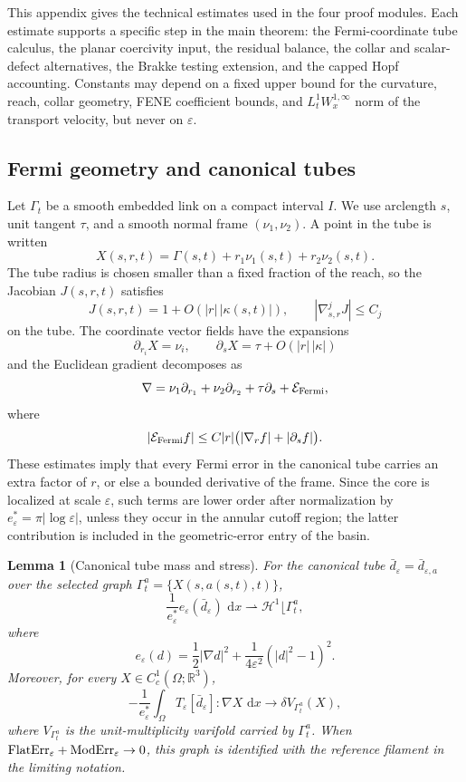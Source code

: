 \documentclass[11pt]{article}
\newtheorem{lemma}[theorem]{Lemma}
\theoremstyle{definition}
\newcommand{\R}{\mathbb R}
\newcommand{\dd}{\,\mathrm d}
\newcommand{\eps}{\varepsilon}
\newcommand{\estar}{e_\varepsilon^\ast}
\newcommand{\Hh}{\mathcal H}
\begin{document}
This appendix gives the technical estimates used in the four proof modules.
Each estimate supports a specific step in the main theorem: the Fermi-coordinate
tube calculus, the planar coercivity input, the residual balance, the collar and
scalar-defect alternatives, the Brakke testing extension, and the capped Hopf
accounting.  Constants may depend on a fixed upper bound for the curvature,
reach, collar geometry, FENE coefficient bounds, and \(L^1_tW^{1,\infty}_x\)
norm of the transport velocity, but never on \(\eps\).

\subsection{Fermi geometry and canonical tubes}

Let \(\Gamma_t\) be a smooth embedded link on a compact interval \(I\).  We use
arclength \(s\), unit tangent \(\tau\), and a smooth normal frame
\((\nu_1,\nu_2)\).  A point in the tube is written
\[
        X(s,r,t)
        =
        \Gamma(s,t)+r_1\nu_1(s,t)+r_2\nu_2(s,t).
\]
The tube radius is chosen smaller than a fixed fraction of the reach, so the
Jacobian \(J(s,r,t)\) satisfies
\[
        J(s,r,t)=1+O(|r|\,|\kappa(s,t)|),
        \qquad
        |\nabla_{s,r}^jJ|\le C_j
\]
on the tube.  The coordinate vector fields have the expansions
\[
        \partial_{r_i}X=\nu_i,
        \qquad
        \partial_sX
        =
        \tau
        +
        O(|r|\,|\kappa|)
\]
and the Euclidean gradient decomposes as
\[
        \nabla
        =
        \nu_1\partial_{r_1}
        +
        \nu_2\partial_{r_2}
        +
        \tau\partial_s
        +
        \mathcal E_{\rm Fermi},
\]
where
\[
        |\mathcal E_{\rm Fermi} f|
        \le
        C|r|
        \bigl(
        |\nabla_r f|+|\partial_s f|
        \bigr).
\]
These estimates imply that every Fermi error in the canonical tube carries an
extra factor of \(r\), or else a bounded derivative of the frame.  Since the
core is localized at scale \(\eps\), such terms are lower order after
normalization by \(\estar=\pi|\log\eps|\), unless they occur in the annular
cutoff region; the latter contribution is included in the geometric-error
entry of the basin.

\begin{lemma}[Canonical tube mass and stress]
\label{lem:app-canonical-mass}
For the canonical tube \(\bar d_\eps=\bar d_{\eps,a}\) over the selected graph
\(\Gamma_t^a=\{X(s,a(s,t),t)\}\),
\[
        \frac{1}{\estar}
        e_\eps(\bar d_\eps)\,\dd x
        \rightharpoonup
        \Hh^1\lfloor\Gamma_t^a ,
\]
where
\[
        e_\eps(d)
        =
        \frac12|\nabla d|^2
        +
        \frac{1}{4\eps^2}(|d|^2-1)^2 .
\]
Moreover, for every \(X\in C_c^1(\Omega;\R^3)\),
\[
        -\frac1{\estar}
        \int_\Omega T_\eps[\bar d_\eps]:\nabla X\,\dd x
        \longrightarrow
        \delta V_{\Gamma_t^a}(X),
\]
where \(V_{\Gamma_t^a}\) is the unit-multiplicity varifold carried by
\(\Gamma_t^a\).  When \({\rm FlatErr}_\eps+{\rm ModErr}_\eps\to0\), this graph
is identified with the reference filament in the limiting notation.
\end{lemma}
\end{document}
